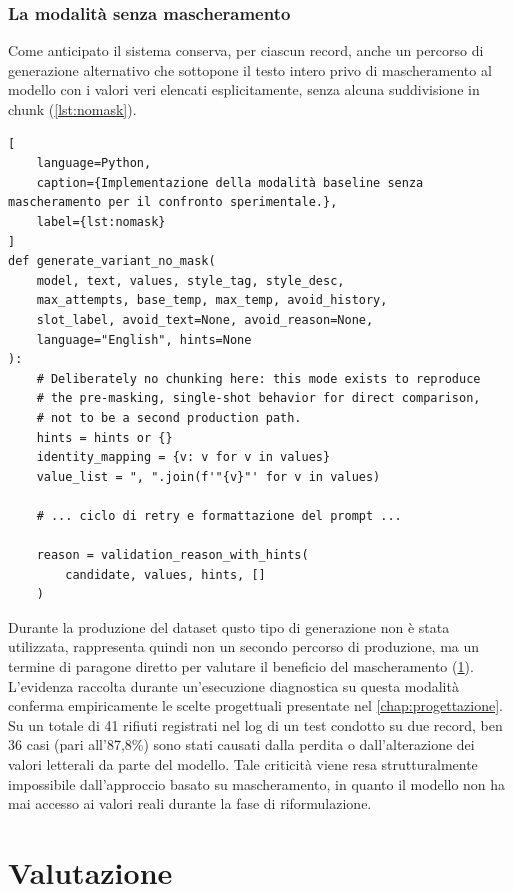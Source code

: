 \documentclass[12pt,a4paper,openright,twoside]{book}
\begin{document}
\subsection{La modalità senza mascheramento}
\label{sec:impl-nomask}

Come anticipato il sistema conserva, per ciascun record, anche un percorso di
generazione alternativo che sottopone il testo intero privo di mascheramento al
modello con i valori veri elencati esplicitamente, senza alcuna suddivisione in
chunk (\cref{lst:nomask}).

\begin{lstlisting}[
    language=Python,
    caption={Implementazione della modalità baseline senza mascheramento per il confronto sperimentale.},
    label={lst:nomask}
]
def generate_variant_no_mask(
    model, text, values, style_tag, style_desc,
    max_attempts, base_temp, max_temp, avoid_history,
    slot_label, avoid_text=None, avoid_reason=None,
    language="English", hints=None
):
    # Deliberately no chunking here: this mode exists to reproduce
    # the pre-masking, single-shot behavior for direct comparison,
    # not to be a second production path.
    hints = hints or {}
    identity_mapping = {v: v for v in values}
    value_list = ", ".join(f'"{v}"' for v in values)
    
    # ... ciclo di retry e formattazione del prompt ...
    
    reason = validation_reason_with_hints(
        candidate, values, hints, []
    )
\end{lstlisting}

Durante la produzione del dataset qusto tipo di generazione non è stata
utilizzata, rappresenta quindi non un secondo percorso di produzione, ma un
termine di paragone diretto per valutare il beneficio del mascheramento
(\cref{chap:evaluation}). L'evidenza raccolta durante un'esecuzione diagnostica
su questa modalità conferma empiricamente le scelte progettuali presentate nel
\cref{chap:progettazione}. Su un totale di 41 rifiuti registrati nel log di un
test condotto su due record, ben 36 casi (pari all'87,8\%) sono stati causati
dalla perdita o dall'alterazione dei valori letterali da parte del modello. Tale
criticità viene resa strutturalmente impossibile dall'approccio basato su
mascheramento, in quanto il modello non ha mai accesso ai valori reali durante
la fase di riformulazione.

\chapter{Valutazione}
\label{chap:evaluation}
\end{document}
